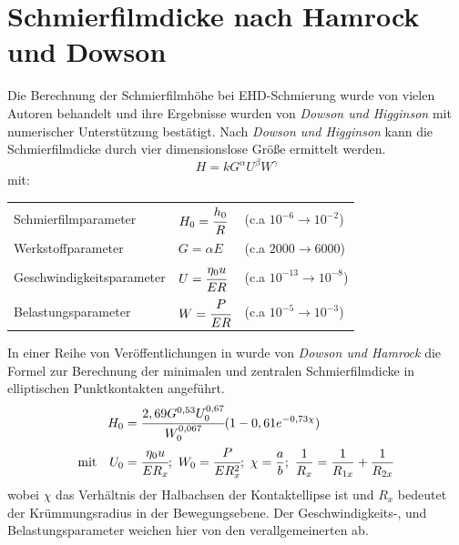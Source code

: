 \section{Schmierfilmdicke nach Hamrock und Dowson}
\label{sec:schmierfilmdicke_nach_hamrock_und_dowson}

Die Berechnung der Schmierfilmhöhe bei EHD-Schmierung wurde von vielen Autoren behandelt und ihre Ergebnisse wurden von \textit{Dowson und Higginson} mit numerischer Unterstützung bestätigt.
Nach \textit{Dowson und Higginson} kann die Schmierfilmdicke durch vier dimensionslose Größe ermittelt werden.
\begin{equation}
    \label{eq:allgemein_schmierfilmdicke}
    H = k G^{\alpha} U^{\beta} W^{\gamma}
\end{equation}
%
mit:

\begin{tabular}{lll}
    Schmierfilmparameter      & $H_0 = \cfrac{h_0}{R}$      & (c.a $10^{-6} \rightarrow 10^{-2}$)   \\
    Werkstoffparameter        & $G = \alpha E$              & (c.a $2000 \rightarrow 6000$)         \\
    Geschwindigkeitsparameter & $U = \cfrac{\eta_0 u}{E R}$ & (c.a $10^{-13} \rightarrow 10 ^{-8}$) \\
    Belastungsparameter       & $W = \cfrac{P}{E R}$        & (c.a $10^{-5} \rightarrow 10^{-3}$)
\end{tabular}
%

In einer Reihe von Veröffentlichungen in \cite{hamrock_dowson_1976_a}\cite{hamrock_dowson_1976_b}\cite{hamrock_dowson_1977_a}\cite{hamrock_dowson_1977_b} wurde von \textit{Dowson und Hamrock} die Formel zur Berechnung der minimalen und zentralen Schmierfilmdicke in elliptischen Punktkontakten angeführt.
\begin{align}
    \label{eq:zentrale_schmierfilmdicke_downson_hamrock}
    H_0 &= \cfrac{2,69 G^{0,53} U_0^{0,67}}{W_0^{0,067}} (1 - 0,61 e^{-0,73 \chi}) \\
    \text{mit} \quad
    U_0 &= \cfrac{\eta_0 u}{E R_x};\ 
    W_0 = \cfrac{P}{E R_x^2};\
    \chi = \frac{a}{b};\
    \frac{1}{R_x} = \frac{1}{R_{1x}} + \frac{1}{R_{2x}} \nonumber 
\end{align}
%
wobei $\chi$ das Verhältnis der Halbachsen der Kontaktellipse ist und $R_x$ bedeutet der Krümmungsradius in der Bewegungsebene.
Der Geschwindigkeits-, und Belastungsparameter weichen hier von den verallgemeinerten ab.

